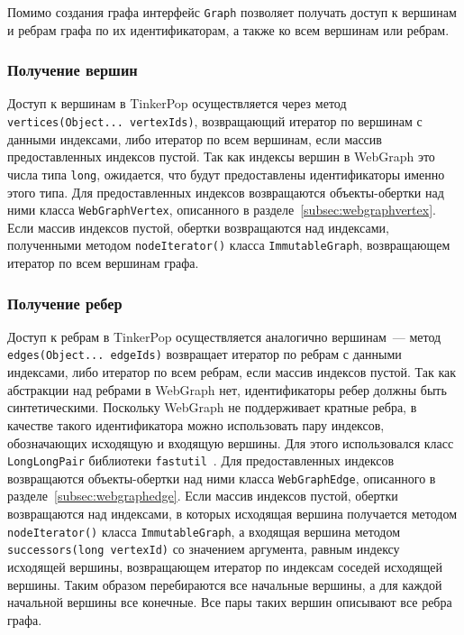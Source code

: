 \documentclass[times,specification,annotation]{itmo-student-thesis}
\begin{document}
Помимо создания графа интерфейс \texttt{Graph} позволяет получать доступ к вершинам и ребрам графа по их идентификаторам, а также ко всем вершинам или ребрам.

\subsubsection{Получение вершин}

Доступ к вершинам в TinkerPop осуществляется через метод \texttt{vertices(Object... vertexIds)}, возвращающий итератор по вершинам с данными индексами, либо итератор по всем вершинам, если массив предоставленных индексов пустой.
Так как индексы вершин в WebGraph это числа типа \texttt{long}, ожидается, что будут предоставлены идентификаторы именно этого типа.
Для предоставленных индексов возвращаются объекты-обертки над ними класса \texttt{WebGraphVertex}, описанного в разделе~\ref{subsec:webgraphvertex}.
Если массив индексов пустой, обертки возвращаются над индексами, полученными методом \texttt{nodeIterator()} класса \texttt{ImmutableGraph}, возвращающем итератор по всем вершинам графа.

\subsubsection{Получение ребер}

Доступ к ребрам в TinkerPop осуществляется аналогично вершинам~--- метод \texttt{edges(Object... edgeIds)} возвращает итератор по ребрам с данными индексами, либо итератор по всем ребрам, если массив индексов пустой.
Так как абстракции над ребрами в WebGraph нет, идентификаторы ребер должны быть синтетическими. Поскольку WebGraph не поддерживает кратные ребра, в качестве такого идентификатора можно использовать пару индексов, обозначающих исходящую и входящую вершины. Для этого использовался класс \texttt{LongLongPair} библиотеки \texttt{fastutil}~\cite{fastutil}.
Для предоставленных индексов возвращаются объекты-обертки над ними класса \texttt{WebGraphEdge}, описанного в разделе~\ref{subsec:webgraphedge}.
Если массив индексов пустой, обертки возвращаются над индексами, в которых исходящая вершина получается методом \texttt{nodeIterator()} класса \texttt{ImmutableGraph}, а входящая вершина методом \texttt{successors(long vertexId)} со значением аргумента, равным индексу исходящей вершины, возвращающем итератор по индексам соседей исходящей вершины. Таким образом перебираются все начальные вершины, а для каждой начальной вершины все конечные. Все пары таких вершин описывают все ребра графа.
\end{document}
